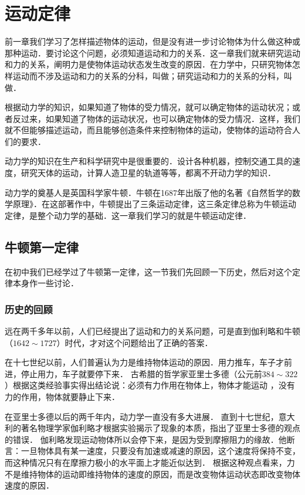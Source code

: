 \chapter{运动定律}\label{chapter-law-of-motion}


前一章我们学习了怎样描述物体的运动，但是没有进一步讨论物体为什么做这种或那种运动．要讨论这个问题，必须知道运动和力的关系．这一章我们就来研究运动和力的关系，阐明力是使物体运动状态发生改变的原因．在力学中，只研究物体怎样运动而不涉及运动和力的关系的分科，叫做；研究运动和力的关系的分科，叫做．

根据动力学的知识，如果知道了物体的受力情况，就可以确定物体的运动状况；或者反过来，如果知道了物体的运动状况，也可以确定物体的受力情况．这样，我们就不但能够描述运动，而且能够创造条件来控制物体的运动，使物体的运动符合人们的要求．

动力学的知识在生产和科学研究中是很重要的．设计各种机器，控制交通工具的速度，研究天体的运动，计算人造卫星的轨道等等，都离不开动力学的知识．

动力学的奠基人是英国科学家牛顿．牛顿在1687年出版了他的名著《自然哲学的数学原理》．在这部著作中，牛顿提出了三条运动定律，这三条定律总称为牛顿运动定律，是整个动力学的基础．这一章我们学习的就是牛顿运动定律．

\section{牛顿第一定律}
在初中我们已经学过了牛顿第一定律，这一节我们先回顾一下历史，然后对这个定律本身作一些讨论．

\subsection{历史的回顾} 
远在两千多年以前，人们已经提出了运动和力的关系问题，可是直到伽利略和牛顿（$1642 \sim 1727$）时代，才对这个问题给出了正确的答案．

在十七世纪以前，人们普遍认为力是维持物体运动的原因．用力推车，车子才前进，停止用力，车子就要停下来．
古希腊的哲学家亚里士多德（公元前$384 \sim 322$）根据这类经验事实得出结论说：必须有力作用在物体上，物体才能运动
，没有力的作用，物体就要静止下来．

在亚里士多德以后的两千年内，动力学一直没有多大进展．
直到十七世纪，意大利的著名物理学家伽利略才根据实验揭示了现象的本质，指出了亚里士多德的观点的错误．
伽利略发现运动物体所以会停下来，是因为受到摩擦阻力的缘故．他断言：一旦物体具有某一速度，只要没有加速或减速的原因，这个速度将保持不变，而这种情况只有在摩擦力极小的水平面上才能近似达到．
根据这种观点看来，力不是维持物体的运动即维持物体的速度的原因，而是改变物体运动状态即改变物体速度的原因．

